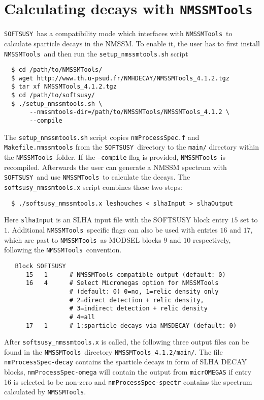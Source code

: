 \documentclass[final,3p,times,pdflatex]{elsarticle}
\def\SOFTSUSY{{\tt SOFTSUSY}}
\def\NMSSMTools{{\tt NMSSMTools}}
\def\code#1{\small{\tt #1}\normalsize}
\begin{document}
\section{Calculating decays with \NMSSMTools\label{sec:decays}}

\SOFTSUSY\ has a compatibility mode which interfaces with \NMSSMTools\
to calculate sparticle decays in the NMSSM.  To enable it, the
user has to first install \NMSSMTools\ and then run the
\code{setup\_nmssmtools.sh} script
%
\begin{verbatim}
  $ cd /path/to/NMSSMTools/
  $ wget http://www.th.u-psud.fr/NMHDECAY/NMSSMTools_4.1.2.tgz
  $ tar xf NMSSMTools_4.1.2.tgz
  $ cd /path/to/softsusy/
  $ ./setup_nmssmtools.sh \
       --nmssmtools-dir=/path/to/NMSSMTools/NMSSMTools_4.1.2 \
       --compile
\end{verbatim}
%
The \code{setup\_nmssmtools.sh} script copies \code{nmProcessSpec.f}
and \code{Makefile.nmssmtools} from the \SOFTSUSY\ directory to the
{\tt main/} directory within the \NMSSMTools\ folder.  If the \code{--compile}
flag is provided, \NMSSMTools\ is recompiled.  Afterwards the user can
generate a NMSSM spectrum with \SOFTSUSY\ and use \NMSSMTools\ to
calculate the decays.  The \code{softsusy\_nmssmtools.x} script combines
these two steps:
%
\begin{verbatim}
  $ ./softsusy_nmssmtools.x leshouches < slhaInput > slhaOutput
\end{verbatim}
%
Here \code{slhaInput} is an SLHA input file with the SOFTSUSY block
entry $15$ set to $1$.  Additional \NMSSMTools\ specific flags can also
be used with entries $16$ and $17$, which are past to \NMSSMTools\ as
MODSEL blocks $9$ and $10$ respectively, following the \NMSSMTools\
convention.
%
\begin{verbatim}
   Block SOFTSUSY
      15   1      # NMSSMTools compatible output (default: 0) 
      16   4      # Select Micromegas option for NMSSMTools
                  # (default: 0) 0=no, 1=relic density only
                  # 2=direct detection + relic density, 
                  # 3=indirect detection + relic density
                  # 4=all  
      17   1      # 1:sparticle decays via NMSDECAY (default: 0)
\end{verbatim}
%
After \code{softsusy\_nmssmtools.x} is called, the following three output
files can be found in the \NMSSMTools\ directory
\code{NMSSMTools\_4.1.2/main/}. The file \code{nmProcessSpec-decay}
contains the sparticle decays in form of SLHA DECAY blocks,
\code{nmProcessSpec-omega} will contain the output from \code{micrOMEGAS} if entry 16 is selected to be non-zero and
\code{nmProcessSpec-spectr} contains the spectrum calculated by
\NMSSMTools.
\end{document}
